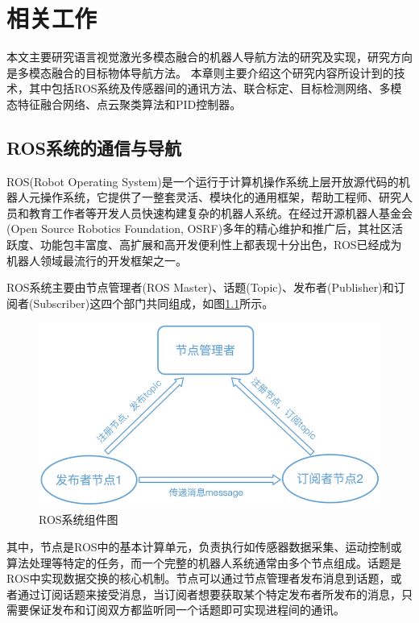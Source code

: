 \chapter{相关工作}

本文主要研究语言视觉激光多模态融合的机器人导航方法的研究及实现，研究方向是多模态融合的目标物体导航方法。
本章则主要介绍这个研究内容所设计到的技术，其中包括ROS系统及传感器间的通讯方法、联合标定、目标检测网络、多模态特征融合网络、点云聚类算法和PID控制器。


\section{ROS系统的通信与导航}
ROS(Robot Operating System)是一个运行于计算机操作系统上层开放源代码的机器人元操作系统，它提供了一整套灵活、模块化的通用框架，帮助工程师、研究人员和教育工作者等开发人员快速构建复杂的机器人系统。在经过开源机器人基金会(Open Source Robotics Foundation, OSRF)多年的精心维护和推广后，其社区活跃度、功能包丰富度、高扩展和高开发便利性上都表现十分出色，ROS已经成为机器人领域最流行的开发框架之一。

ROS系统主要由节点管理者(ROS Master)、话题(Topic)、发布者(Publisher)和订阅者(Subscriber)这四个部门共同组成，如图\ref{frossystem}所示。
\begin{figure}[htbp]
    \centering
    \includegraphics[scale=0.80]{Fig/rossystem.png}
    \caption{\label{frossystem}ROS系统组件图}
\end{figure}
其中，节点是ROS中的基本计算单元，负责执行如传感器数据采集、运动控制或算法处理等特定的任务，而一个完整的机器人系统通常由多个节点组成。话题是ROS中实现数据交换的核心机制。节点可以通过节点管理者发布消息到话题，或者通过订阅话题来接受消息，当订阅者想要获取某个特定发布者所发布的消息，只需要保证发布和订阅双方都监听同一个话题即可实现进程间的通讯。



